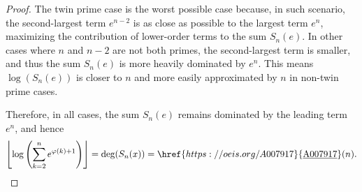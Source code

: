 \documentclass[10pt,a4paper]{article}
\theoremstyle{plain}
\newcommand{\floor}[1]{\left\lfloor #1 \right\rfloor}
\newcommand{\seqnum}[1]{\href{https://oeis.org/#1}{\rm \underline{#1}}}
\begin{document}
\begin{proof}
The twin prime case is the worst possible case because, in such scenario, the second-largest term $e^{n-2}$ is as close as possible to the largest term $e^n$, maximizing the contribution of lower-order terms to the sum $S_n(e)$. In other cases where $n$ and $n-2$ are not both primes, the second-largest term is smaller, and thus the sum $S_n(e)$ is more heavily dominated by $e^n$. This means $\log(S_n(e))$ is closer to $n$ and more easily approximated by $n$ in non-twin prime cases.

Therefore, in all cases, the sum $S_n(e)$ remains dominated by the leading term $e^n$, and hence
\begin{align*}
\floor{ \log\left( \sum_{k=2}^n e^{\varphi(k)+1} \right) } = \deg(S_n(x)) = \seqnum{A007917}(n) .
\end{align*}
\end{proof}
\end{document}
